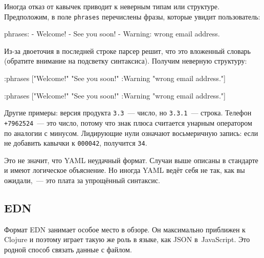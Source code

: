 Иногда отказ от кавычек приводит к неверным типам или структуре. Предположим, в
поле \verb|phrases| перечислены фразы, которые увидит пользователь:

\begin{english}
  \begin{yaml}
phrases:
  - Welcome!
  - See you soon!
  - Warning: wrong email address.
  \end{yaml}
\end{english}

Из-за двоеточия в последней строке парсер решит, что это вложенный словарь
(обратите внимание на подсветку синтаксиса). Получим неверную структуру:

\ifnarrow

\begin{english}
  \begin{clojure}
{:phrases
 ["Welcome!"
  "See you soon!"
  {:Warning "wrong email address."}]}
  \end{clojure}
\end{english}

\else

\begin{english}
  \begin{clojure}
{:phrases ["Welcome!"
           "See you soon!"
           {:Warning "wrong email address."}]}
  \end{clojure}
\end{english}

\fi

Другие примеры: версия продукта \verb|3.3|~--- число, но \verb|3.3.1|~---
строка. Телефон \texttt{+7962524}~--- это число, потому что знак плюса
считается унарным оператором по аналогии с минусом. Лидирующие нули означают
восьмеричную запись: если не добавить кавычки к \verb|000042|, получится
\verb|34|.

Это не значит, что YAML неудачный формат. Случаи выше описаны в стандарте и
имеют логическое объяснение. Но иногда YAML ведёт себя не так, как вы
ожидали,~--- это плата за упрощённый синтаксис.

\subsection{EDN}


Формат EDN занимает особое место в обзоре. Он максимально приближен к Clojure и
поэтому играет такую же роль в языке, как JSON в~JavaScript. Это родной способ
связать данные с файлом.

